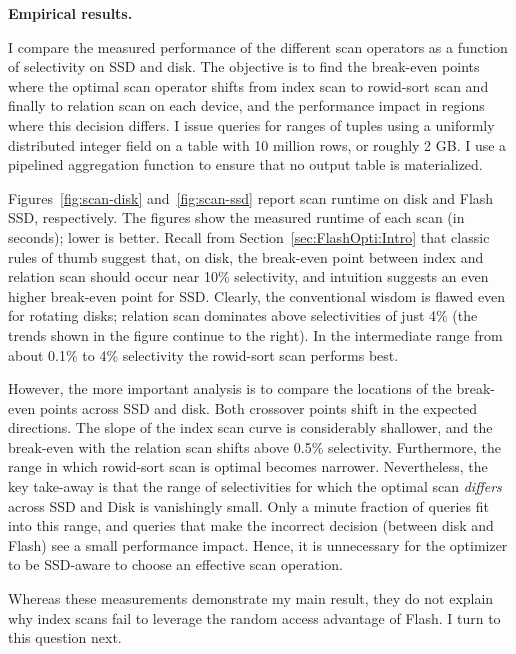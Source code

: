 \textbf{Empirical results.}

I compare the measured performance of the different scan operators as a function of selectivity on SSD and disk.
The objective is to find the break-even points where the optimal scan operator shifts from index scan to rowid-sort scan and finally to relation scan on each device, and the performance impact in regions where this decision differs.
I issue queries for ranges of tuples using a uniformly distributed integer field on a table with 10 million rows, or roughly 2 GB. 
I use a pipelined aggregation function to ensure that no output table is materialized.

Figures~\ref{fig:scan-disk} and~\ref{fig:scan-ssd} report scan runtime on disk and Flash SSD, respectively.
The figures show the measured runtime of each scan (in seconds); lower is better. 
Recall from Section~\ref{sec:FlashOpti:Intro} that classic rules of thumb suggest that, on disk, the break-even point between index and relation scan should occur near 10\% selectivity, and intuition suggests an even higher break-even point for SSD.
Clearly, the conventional wisdom is flawed even for rotating disks; relation scan dominates above selectivities of just 4\% (the trends shown in the figure continue to the right).  
In the intermediate range from about 0.1\% to 4\% selectivity the rowid-sort scan performs best.

However, the more important analysis is to compare the locations of the break-even points across SSD and disk.  
Both crossover points shift in the expected directions.
The slope of the index scan curve is considerably shallower, and the break-even with the relation scan shifts above 0.5\% selectivity.  
Furthermore, the range in which rowid-sort scan is optimal becomes narrower.
Nevertheless, the key take-away is that the range of selectivities for which the optimal scan \emph{differs} across SSD and Disk is vanishingly small.
Only a minute fraction of queries fit into this range, and queries that make the incorrect decision (between disk and Flash) see a small performance impact.
Hence, it is unnecessary for the optimizer to be SSD-aware to choose an effective scan operation.

Whereas these measurements demonstrate my main result, they do not explain why index scans fail to leverage the random access advantage of Flash.  
I turn to this question next. 

